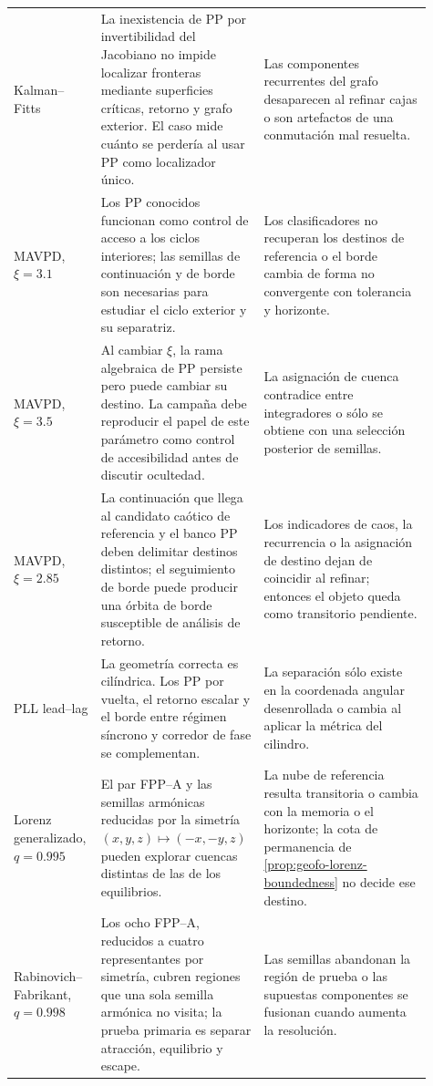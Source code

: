 \begin{longtable}{@{}p{0.17\linewidth}p{0.35\linewidth}p{0.39\linewidth}@{}}
Kalman--Fitts
& La inexistencia de PP por invertibilidad del Jacobiano no impide localizar
  fronteras mediante superficies críticas, retorno y grafo exterior. El caso
  mide cuánto se perdería al usar PP como localizador único.
& Las componentes recurrentes del grafo desaparecen al refinar cajas o son
  artefactos de una conmutación mal resuelta.\\

MAVPD, \(\xi=3.1\)
& Los PP conocidos funcionan como control de acceso a los ciclos interiores;
  las semillas de continuación y de borde son necesarias para estudiar el
  ciclo exterior y su separatriz.
& Los clasificadores no recuperan los destinos de referencia o el borde cambia
  de forma no convergente con tolerancia y horizonte.\\

MAVPD, \(\xi=3.5\)
& Al cambiar \(\xi\), la rama algebraica de PP persiste pero puede cambiar su
  destino. La campaña debe reproducir el papel de este parámetro como control
  de accesibilidad antes de discutir ocultedad.
& La asignación de cuenca contradice entre integradores o sólo se obtiene con
  una selección posterior de semillas.\\

MAVPD, \(\xi=2.85\)
& La continuación que llega al candidato caótico de referencia y el banco PP
  deben delimitar destinos distintos; el seguimiento de borde puede producir
  una órbita de borde susceptible de análisis de retorno.
& Los indicadores de caos, la recurrencia o la asignación de destino dejan de
  coincidir al refinar; entonces el objeto queda como transitorio pendiente.\\

PLL lead--lag
& La geometría correcta es cilíndrica. Los PP por vuelta, el retorno escalar y
  el borde entre régimen síncrono y corredor de fase se complementan.
& La separación sólo existe en la coordenada angular desenrollada o cambia al
  aplicar la métrica del cilindro.\\

Lorenz generalizado, \(q=0.995\)
& El par FPP--A y las semillas armónicas reducidas por la simetría
  \((x,y,z)\mapsto(-x,-y,z)\) pueden explorar cuencas distintas de las de los
  equilibrios.
& La nube de referencia resulta transitoria o cambia con la memoria o el
  horizonte; la cota de permanencia de \cref{prop:geofo-lorenz-boundedness}
  no decide ese destino.\\

Rabinovich--Fabrikant, \(q=0.998\)
& Los ocho FPP--A, reducidos a cuatro representantes por simetría, cubren
  regiones que una sola semilla armónica no visita; la prueba primaria es
  separar atracción, equilibrio y escape.
& Las semillas abandonan la región de prueba o las supuestas componentes se
  fusionan cuando aumenta la resolución.\\


\end{longtable}
